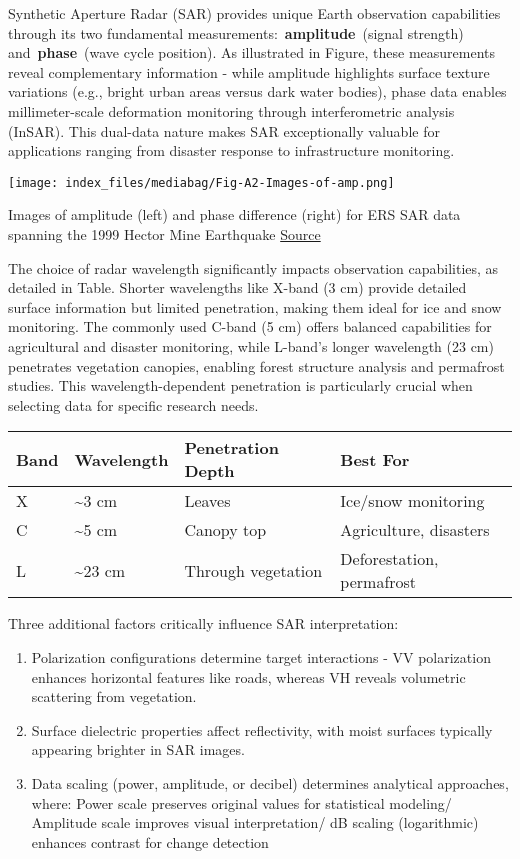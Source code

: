 \documentclass[
  letterpaper,
  DIV=11,
  numbers=noendperiod]{scrreprt}
\providecommand{\tightlist}{%
  \setlength{\itemsep}{0pt}\setlength{\parskip}{0pt}}\usepackage{longtable,booktabs,array}
\begin{document}
Synthetic Aperture Radar (SAR) provides unique Earth observation
capabilities through its two fundamental
measurements:~\textbf{amplitude}~(signal strength)
and~\textbf{phase}~(wave cycle position). As illustrated in Figure,
these measurements reveal complementary information - while amplitude
highlights surface texture variations (e.g., bright urban areas versus
dark water bodies), phase data enables millimeter-scale deformation
monitoring through interferometric analysis (InSAR). This dual-data
nature makes SAR exceptionally valuable for applications ranging from
disaster response to infrastructure monitoring.

\texttt{[image: index\_files/mediabag/Fig-A2-Images-of-amp.png]}

Images of amplitude (left) and phase difference (right) for ERS SAR data
spanning the 1999 Hector Mine Earthquake
\href{https://www.researchgate.net/figure/Fig-A2-Images-of-amplitude-left-and-phase-difference-right-for-ERS-SAR-data_fig8_256830372}{Source}

The choice of radar wavelength significantly impacts observation
capabilities, as detailed in Table. Shorter wavelengths like X-band (3
cm) provide detailed surface information but limited penetration, making
them ideal for ice and snow monitoring. The commonly used C-band (5 cm)
offers balanced capabilities for agricultural and disaster monitoring,
while L-band's longer wavelength (23 cm) penetrates vegetation canopies,
enabling forest structure analysis and permafrost studies. This
wavelength-dependent penetration is particularly crucial when selecting
data for specific research needs.

\begin{longtable}[]{@{}llll@{}}
\toprule\noalign{}
Band & Wavelength & Penetration Depth & Best For \\
\midrule\noalign{}
\endhead
\bottomrule\noalign{}
\endlastfoot
X & \textasciitilde3 cm & Leaves & Ice/snow monitoring \\
C & \textasciitilde5 cm & Canopy top & Agriculture, disasters \\
L & \textasciitilde23 cm & Through vegetation & Deforestation,
permafrost \\
\end{longtable}

Three additional factors critically influence SAR interpretation:

\begin{enumerate}
\def\labelenumi{\arabic{enumi}.}
\tightlist
\item
  Polarization configurations determine target interactions - VV
  polarization enhances horizontal features like roads, whereas VH
  reveals volumetric scattering from vegetation.
\item
  Surface dielectric properties affect reflectivity, with moist surfaces
  typically appearing brighter in SAR images.
\item
  Data scaling (power, amplitude, or decibel) determines analytical
  approaches, where: Power scale preserves original values for
  statistical modeling/ Amplitude scale improves visual interpretation/
  dB scaling (logarithmic) enhances contrast for change detection
\end{enumerate}
\end{document}
